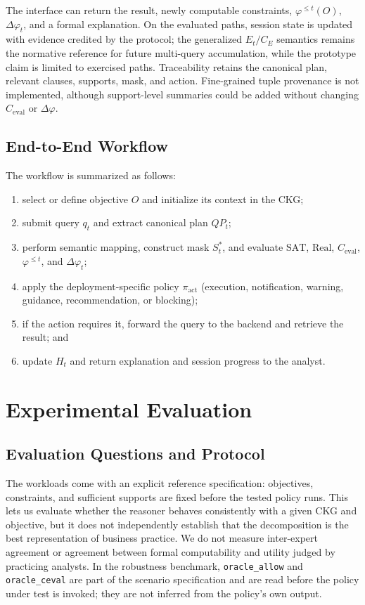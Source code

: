 \documentclass[journal]{IEEEtran}
\begin{document}
The interface can return the result, newly computable constraints, $\varphi^{\le t}(O)$, $\Delta\varphi_t$, and a formal explanation. On the evaluated paths, session state is updated with evidence credited by the protocol; the generalized $E_t/C_E$ semantics remains the normative reference for future multi-query accumulation, while the prototype claim is limited to exercised paths. Traceability retains the canonical plan, relevant clauses, supports, mask, and action. Fine-grained tuple provenance is not implemented, although support-level summaries could be added without changing $C_{\mathrm{eval}}$ or $\Delta\varphi$.

\subsection{End-to-End Workflow}

The workflow is summarized as follows:
\begin{enumerate}
  \item select or define objective $O$ and initialize its context in the CKG;
  \item submit query $q_t$ and extract canonical plan $QP_t$;
  \item perform semantic mapping, construct mask $S_t^*$, and evaluate $\mathrm{SAT}$, $\mathrm{Real}$, $C_{\mathrm{eval}}$, $\varphi^{\le t}$, and $\Delta\varphi_t$;
  \item apply the deployment-specific policy $\pi_{\mathrm{act}}$ (execution, notification, warning, guidance, recommendation, or blocking);
  \item if the action requires it, forward the query to the backend and retrieve the result; and
  \item update $H_t$ and return explanation and session progress to the analyst.
\end{enumerate}

\section{Experimental Evaluation}
\label{sec:exp}
\label{sec:experiments}

\subsection{Evaluation Questions and Protocol}

The workloads come with an explicit reference specification: objectives, constraints, and sufficient supports are fixed before the tested policy runs. This lets us evaluate whether the reasoner behaves consistently with a given CKG and objective, but it does not independently establish that the decomposition is the best representation of business practice. We do not measure inter-expert agreement or agreement between formal computability and utility judged by practicing analysts. In the robustness benchmark, \texttt{oracle\_allow} and \texttt{oracle\_ceval} are part of the scenario specification and are read before the policy under test is invoked; they are not inferred from the policy's own output.
\end{document}
